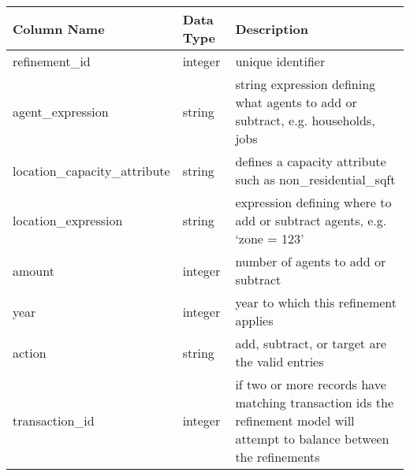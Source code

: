 \begin{tabular}{p{2.3in}lp{3.2in}}
\textbf{Column Name} & \textbf{Data Type} & \textbf{Description} \\
\hline
refinement\_id & integer & unique identifier\\ \hline
agent\_expression & string & string expression defining what agents to add or subtract, e.g. households, jobs\\ \hline
location\_capacity\_attribute & string & defines a capacity attribute such as non\_residential\_sqft\\ \hline
location\_expression & string & expression defining where to add or subtract agents, e.g. `zone = 123'\\ \hline
amount & integer & number of agents to add or subtract\\ \hline
year & integer & year to which this refinement applies\\ \hline
action & string & add, subtract, or target are the valid entries\\ \hline
transaction\_id & integer & if two or more records have matching transaction ids the refinement model will attempt to balance between the refinements \\ \hline
\end{tabular}

